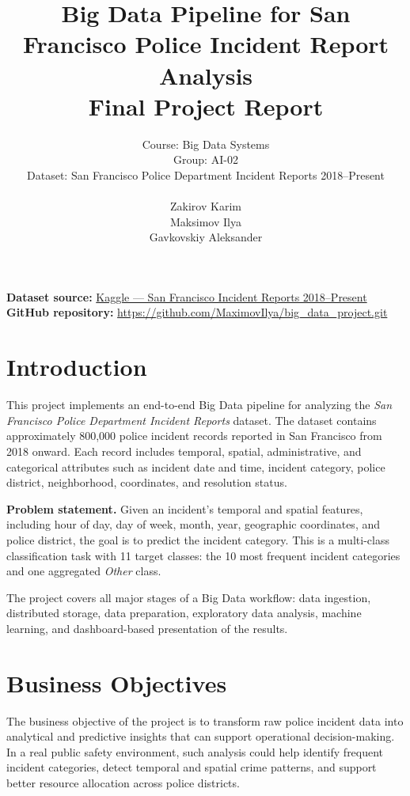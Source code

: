 \documentclass[12pt,a4paper]{article}
\title{\textbf{Big Data Pipeline for San Francisco Police Incident Report Analysis}\\
\large Final Project Report}
\author{Course: Big Data Systems\\Group: AI-02\\Dataset: San Francisco Police Department Incident Reports 2018--Present\\\vspace{0.3cm}\\Zakirov Karim\\Maksimov Ilya\\Gavkovskiy Aleksander}
\date{}
\begin{document}
\maketitle

\begin{center}
\textbf{Dataset source:} \href{https://www.kaggle.com/datasets/vivovinco/san-francisco-incident-reports-2018present}{Kaggle --- San Francisco Incident Reports 2018--Present}\\
\textbf{GitHub repository:} \href{https://github.com/MaximovIlya/big_data_project.git}{https://github.com/MaximovIlya/big_data_project.git}
\end{center}

\tableofcontents
\newpage

\section{Introduction}

This project implements an end-to-end Big Data pipeline for analyzing the \textit{San Francisco Police Department Incident Reports} dataset. The dataset contains approximately 800,000 police incident records reported in San Francisco from 2018 onward. Each record includes temporal, spatial, administrative, and categorical attributes such as incident date and time, incident category, police district, neighborhood, coordinates, and resolution status.

\textbf{Problem statement.} Given an incident's temporal and spatial features, including hour of day, day of week, month, year, geographic coordinates, and police district, the goal is to predict the incident category. This is a multi-class classification task with 11 target classes: the 10 most frequent incident categories and one aggregated \textit{Other} class.

The project covers all major stages of a Big Data workflow: data ingestion, distributed storage, data preparation, exploratory data analysis, machine learning, and dashboard-based presentation of the results.

\section{Business Objectives}

The business objective of the project is to transform raw police incident data into analytical and predictive insights that can support operational decision-making. In a real public safety environment, such analysis could help identify frequent incident categories, detect temporal and spatial crime patterns, and support better resource allocation across police districts.
\end{document}

